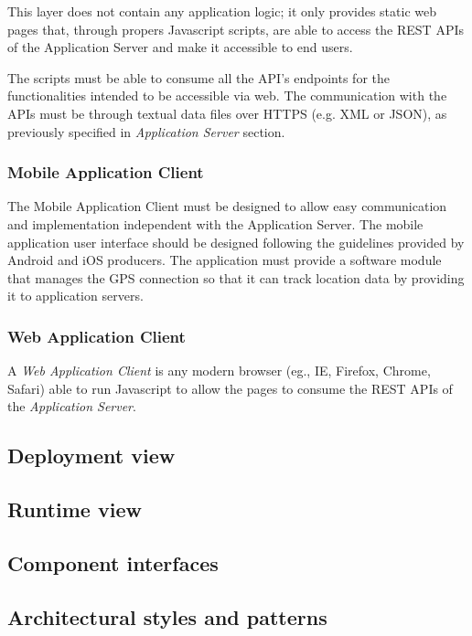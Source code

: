 \documentclass{article}
\begin{document}
	\bigskip
	This layer does not contain any application logic; it only provides static web pages that, through propers Javascript scripts, are able to access the REST APIs of the Application Server and make it accessible to end users.

	\bigskip
	The scripts must be able to consume all the API's endpoints for the functionalities intended to be accessible via web.
	The communication with the APIs must be through textual data files over HTTPS (e.g. XML or JSON), as previously specified in \textit{Application Server} section.


	\subsubsection{Mobile Application Client}
	The Mobile Application Client must be designed to allow easy communication and implementation independent with the Application Server.
	The mobile application user interface should be designed following the guidelines provided by Android and iOS producers.
	The application must provide a software module that manages the GPS connection so that it can track location data by providing it to application servers.


	\subsubsection{Web Application Client}
	A \textit{Web Application Client} is any modern browser (eg., IE, Firefox, Chrome, Safari) able to run Javascript to allow the pages to consume the REST APIs of the \textit{Application Server}.


	\subsection{Deployment view}


	\subsection{Runtime view}


	\subsection{Component interfaces}
	
	
	\subsection{Architectural styles and patterns}
\end{document}
